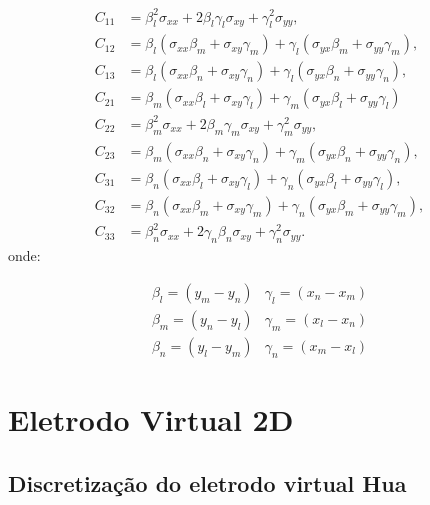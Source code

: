 \documentclass[
12pt,
a4paper,
oneside,
chapter=TITLE,
sumario=tradicional
]{abntex2}
\begin{document}
{\small
\begin{align*}
C_{11} &= \beta_l^2\sigma_{xx}+2\beta_l\gamma_l\sigma_{xy}+\gamma_l^2\sigma_{yy}, \\
C_{12} &=\beta_l(\sigma_{xx}\beta_m+\sigma_{xy}\gamma_m)+\gamma_l(\sigma_{yx}\beta_m+\sigma_{yy}\gamma_m), \\
C_{13} &= \beta_l(\sigma_{xx}\beta_n+\sigma_{xy}\gamma_n)+\gamma_l(\sigma_{yx}\beta_n+\sigma_{yy}\gamma_n),\\
C_{21} &= \beta_m(\sigma_{xx}\beta_l+\sigma_{xy}\gamma_l)+\gamma_m(\sigma_{yx}\beta_l+\sigma_{yy}\gamma_l) \\
C_{22} &= \beta_m^2\sigma_{xx}+2\beta_m\gamma_m\sigma_{xy}+\gamma_m^2\sigma_{yy}, \\
C_{23} &= \beta_m(\sigma_{xx}\beta_n+\sigma_{xy}\gamma_n)+\gamma_m(\sigma_{yx}\beta_n+\sigma_{yy}\gamma_n),\\
C_{31} &= \beta_n(\sigma_{xx}\beta_l+\sigma_{xy}\gamma_l)+\gamma_n(\sigma_{yx}\beta_l+\sigma_{yy}\gamma_l),\\
C_{32} &= \beta_n(\sigma_{xx}\beta_m+\sigma_{xy}\gamma_m)+\gamma_n(\sigma_{yx}\beta_m+\sigma_{yy}\gamma_m),\\
C_{33} &= \beta_n^2\sigma_{xx}+2\gamma_n\beta_n\sigma_{xy}+\gamma_n^2\sigma_{yy}.
\end{align*}
}
onde:


    \begin{equation*}
	\begin{array}{ccc}
		\beta_l = (y_m - y_n) &
		\gamma_l = (x_n - x_m) \\[6pt]
		
		\beta_m = (y_n - y_l) &
		\gamma_m = (x_l - x_n) \\[6pt]
		
		\beta_n = (y_l - y_m) &
		\gamma_n = (x_m - x_l)
	\end{array}
\end{equation*}

\begin{center}
\end{center}


	\chapter{Eletrodo Virtual 2D} 
	
    \section{Discretização do eletrodo virtual Hua}
    
\end{document}
